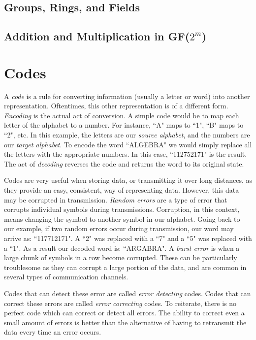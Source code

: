 \documentclass{article}
\begin{document}
\subsection{Groups, Rings, and Fields}

\subsection{Addition and Multiplication in GF($2^{m}$)}

\section{Codes}
A \textit{code} is a rule for converting information (usually a letter or word) into another representation. Oftentimes, this other representation is of a different form. \textit{Encoding} is the actual act of conversion. A simple code would be to map each letter of the alphabet to a number. For instance, ``A" maps to ``1", ``B" maps to ``2", etc. In this example, the letters are our \textit{source alphabet}, and the numbers are our \textit{target alphabet}. To encode the word ``ALGEBRA" we would simply replace all the letters with the appropriate numbers. In this case, ``112752171" is the result. The act of \textit{decoding} reverses the code and returns the word to its original state.

Codes are very useful when storing data, or transmitting it over long distances, as they provide an easy, consistent, way of representing data. However, this data may be corrupted in transmission. \textit{Random errors} are a type of error that corrupts individual symbols during transmissions. Corruption, in this context, means changing the symbol to another symbol in our alphabet. Going back to our example, if two random errors occur during transmission, our word may arrive as: ``117712171". A ``2" was replaced with a ``7" and a ``5" was replaced with a ``1". As a result our decoded word is: ``ARGABRA". A \textit{burst error} is when a large chunk of symbols in a row become corrupted. These can be particularly troublesome as they can corrupt a large portion of the data, and are common in several types of communication channels.

Codes that can detect these error are called \textit{error detecting} codes. Codes that can correct these errors are called \textit{error correcting} codes. To reiterate, there is no perfect code which can correct or detect all errors. The ability to correct even a small amount of errors is better than the alternative of having to retransmit the data every time an error occurs.
\end{document}
